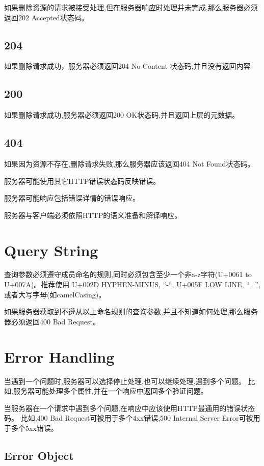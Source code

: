 如果删除资源的请求被接受处理,但在服务器响应时处理并未完成,那么服务器必须返回202 Accepted状态码。

\subsection{204}

如果删除请求成功，服务器必须返回204 No Content 状态码,并且没有返回内容

\subsection{200}

如果删除请求成功,服务器必须返回200 OK状态码,并且返回上层的元数据。


\subsection{404}

如果因为资源不存在,删除请求失败,那么服务器应该返回404 Not Found状态码。

服务器可能使用其它HTTP错误状态码反映错误。

服务器可能响应包括错误详情的错误响应。

服务器与客户端必须依照HTTP的语义准备和解译响应。

\section{Query String}

查询参数必须遵守成员命名的规则,同时必须包含至少一个非a-z字符(U+0061 to U+007A)。推荐使用 U+002D HYPHEN-MINUS, “-“, U+005F LOW LINE, “\_”, 或者大写字母(如camelCasing)。

如果服务器获取到不遵从以上命名规则的查询参数,并且不知道如何处理,那么服务器必须返回400 Bad Request。


\section{Error Handling}


当遇到一个问题时,服务器可以选择停止处理,也可以继续处理,遇到多个问题。 比如,服务器可能处理多个属性,并在一个响应中返回多个验证问题。

当服务器在一个请求中遇到多个问题,在响应中应该使用HTTP最通用的错误状态码。 比如,400 Bad Request可被用于多个4xx错误,500 Internal Server Error可被用于多个5xx错误。


\subsection{Error Object}

